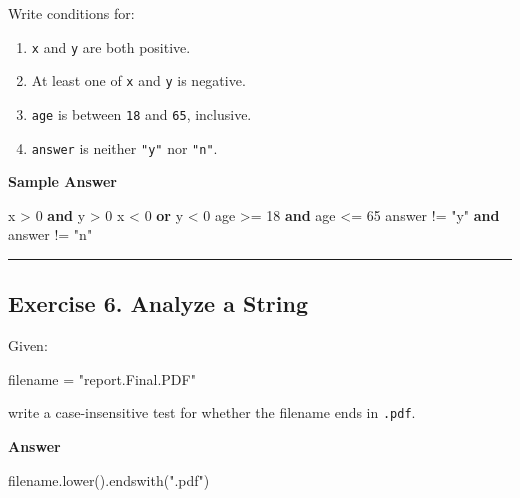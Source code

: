 \documentclass[
  11pt,
  a4paper,
]{article}
\newenvironment{Shaded}{}{}
\newcommand{\DecValTok}[1]{\textcolor[rgb]{0.25,0.63,0.44}{#1}}
\newcommand{\KeywordTok}[1]{\textcolor[rgb]{0.00,0.44,0.13}{\textbf{#1}}}
\newcommand{\NormalTok}[1]{#1}
\newcommand{\OperatorTok}[1]{\textcolor[rgb]{0.40,0.40,0.40}{#1}}
\newcommand{\StringTok}[1]{\textcolor[rgb]{0.25,0.44,0.63}{#1}}
\providecommand{\tightlist}{%
  \setlength{\itemsep}{0pt}\setlength{\parskip}{0pt}}
\begin{document}
Write conditions for:

\begin{enumerate}
\def\labelenumi{\arabic{enumi}.}
\tightlist
\item
  \texttt{x} and \texttt{y} are both positive.
\item
  At least one of \texttt{x} and \texttt{y} is negative.
\item
  \texttt{age} is between \texttt{18} and \texttt{65}, inclusive.
\item
  \texttt{answer} is neither \texttt{"y"} nor \texttt{"n"}.
\end{enumerate}

\textbf{Sample Answer}

\begin{Shaded}
\begin{Highlighting}[]
\NormalTok{x }\OperatorTok{\textgreater{}} \DecValTok{0} \KeywordTok{and}\NormalTok{ y }\OperatorTok{\textgreater{}} \DecValTok{0}
\NormalTok{x }\OperatorTok{\textless{}} \DecValTok{0} \KeywordTok{or}\NormalTok{ y }\OperatorTok{\textless{}} \DecValTok{0}
\NormalTok{age }\OperatorTok{\textgreater{}=} \DecValTok{18} \KeywordTok{and}\NormalTok{ age }\OperatorTok{\textless{}=} \DecValTok{65}
\NormalTok{answer }\OperatorTok{!=} \StringTok{"y"} \KeywordTok{and}\NormalTok{ answer }\OperatorTok{!=} \StringTok{"n"}
\end{Highlighting}
\end{Shaded}

\begin{center}\rule{0.5\linewidth}{0.5pt}\end{center}

\subsection{Exercise 6. Analyze a
String}\label{exercise-6.-analyze-a-string}

Given:

\begin{Shaded}
\begin{Highlighting}[]
\NormalTok{filename }\OperatorTok{=} \StringTok{"report.Final.PDF"}
\end{Highlighting}
\end{Shaded}

write a case-insensitive test for whether the filename ends in
\texttt{.pdf}.

\textbf{Answer}

\begin{Shaded}
\begin{Highlighting}[]
\NormalTok{filename.lower().endswith(}\StringTok{".pdf"}\NormalTok{)}
\end{Highlighting}
\end{Shaded}
\end{document}
